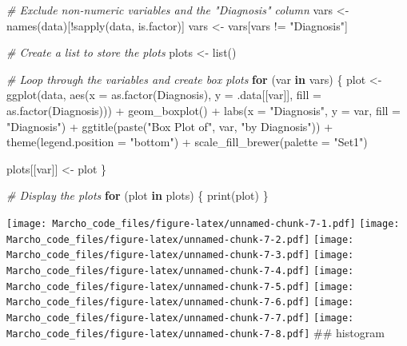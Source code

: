 \documentclass[
]{article}
\newenvironment{Shaded}{\begin{snugshade}}{\end{snugshade}}
\newcommand{\AttributeTok}[1]{\textcolor[rgb]{0.77,0.63,0.00}{#1}}
\newcommand{\CommentTok}[1]{\textcolor[rgb]{0.56,0.35,0.01}{\textit{#1}}}
\newcommand{\ControlFlowTok}[1]{\textcolor[rgb]{0.13,0.29,0.53}{\textbf{#1}}}
\newcommand{\FunctionTok}[1]{\textcolor[rgb]{0.00,0.00,0.00}{#1}}
\newcommand{\NormalTok}[1]{#1}
\newcommand{\OtherTok}[1]{\textcolor[rgb]{0.56,0.35,0.01}{#1}}
\newcommand{\SpecialCharTok}[1]{\textcolor[rgb]{0.00,0.00,0.00}{#1}}
\newcommand{\StringTok}[1]{\textcolor[rgb]{0.31,0.60,0.02}{#1}}
\begin{document}
\begin{Shaded}
\begin{Highlighting}[]
\CommentTok{\# Exclude non{-}numeric variables and the "Diagnosis" column}
\NormalTok{vars }\OtherTok{\textless{}{-}} \FunctionTok{names}\NormalTok{(data)[}\SpecialCharTok{!}\FunctionTok{sapply}\NormalTok{(data, is.factor)]}
\NormalTok{vars }\OtherTok{\textless{}{-}}\NormalTok{ vars[vars }\SpecialCharTok{!=} \StringTok{"Diagnosis"}\NormalTok{]}

\CommentTok{\# Create a list to store the plots}
\NormalTok{plots }\OtherTok{\textless{}{-}} \FunctionTok{list}\NormalTok{()}

\CommentTok{\# Loop through the variables and create box plots}
\ControlFlowTok{for}\NormalTok{ (var }\ControlFlowTok{in}\NormalTok{ vars) \{}
\NormalTok{  plot }\OtherTok{\textless{}{-}} \FunctionTok{ggplot}\NormalTok{(data, }\FunctionTok{aes}\NormalTok{(}\AttributeTok{x =} \FunctionTok{as.factor}\NormalTok{(Diagnosis), }\AttributeTok{y =}\NormalTok{ .data[[var]], }\AttributeTok{fill =} \FunctionTok{as.factor}\NormalTok{(Diagnosis))) }\SpecialCharTok{+}
    \FunctionTok{geom\_boxplot}\NormalTok{() }\SpecialCharTok{+}
    \FunctionTok{labs}\NormalTok{(}\AttributeTok{x =} \StringTok{"Diagnosis"}\NormalTok{, }\AttributeTok{y =}\NormalTok{ var, }\AttributeTok{fill =} \StringTok{"Diagnosis"}\NormalTok{) }\SpecialCharTok{+}
    \FunctionTok{ggtitle}\NormalTok{(}\FunctionTok{paste}\NormalTok{(}\StringTok{"Box Plot of"}\NormalTok{, var, }\StringTok{"by Diagnosis"}\NormalTok{)) }\SpecialCharTok{+}
    \FunctionTok{theme}\NormalTok{(}\AttributeTok{legend.position =} \StringTok{"bottom"}\NormalTok{) }\SpecialCharTok{+}
    \FunctionTok{scale\_fill\_brewer}\NormalTok{(}\AttributeTok{palette =} \StringTok{"Set1"}\NormalTok{)}
  
\NormalTok{  plots[[var]] }\OtherTok{\textless{}{-}}\NormalTok{ plot}
\NormalTok{\}}

\CommentTok{\# Display the plots}
\ControlFlowTok{for}\NormalTok{ (plot }\ControlFlowTok{in}\NormalTok{ plots) \{}
  \FunctionTok{print}\NormalTok{(plot)}
\NormalTok{\}}
\end{Highlighting}
\end{Shaded}

\texttt{[image: Marcho\_code\_files/figure-latex/unnamed-chunk-7-1.pdf]}
\texttt{[image: Marcho\_code\_files/figure-latex/unnamed-chunk-7-2.pdf]}
\texttt{[image: Marcho\_code\_files/figure-latex/unnamed-chunk-7-3.pdf]}
\texttt{[image: Marcho\_code\_files/figure-latex/unnamed-chunk-7-4.pdf]}
\texttt{[image: Marcho\_code\_files/figure-latex/unnamed-chunk-7-5.pdf]}
\texttt{[image: Marcho\_code\_files/figure-latex/unnamed-chunk-7-6.pdf]}
\texttt{[image: Marcho\_code\_files/figure-latex/unnamed-chunk-7-7.pdf]}
\texttt{[image: Marcho\_code\_files/figure-latex/unnamed-chunk-7-8.pdf]}
\#\# histogram
\end{document}
